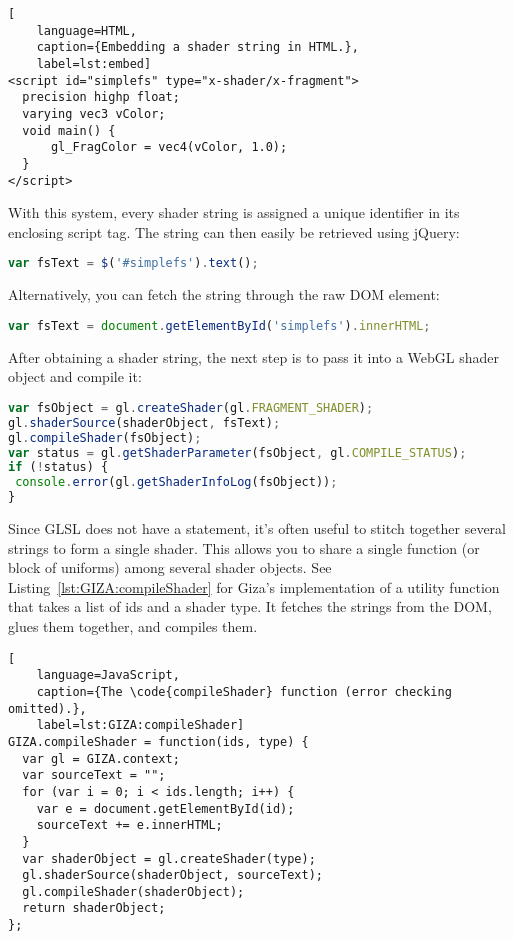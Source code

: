 \begin{lstlisting}[
    language=HTML,
    caption={Embedding a shader string in HTML.},
    label=lst:embed]
<script id="simplefs" type="x-shader/x-fragment">
  precision highp float;
  varying vec3 vColor;
  void main() {
      gl_FragColor = vec4(vColor, 1.0);
  }
</script>
\end{lstlisting}

With this system, every shader string is assigned a unique identifier in its enclosing script tag.  The string can then easily be retrieved using jQuery:

\begin{lstlisting}[language=JavaScript]
var fsText = $('#simplefs').text();
\end{lstlisting} %

Alternatively, you can fetch the string through the raw DOM element:

\begin{lstlisting}[language=JavaScript]
var fsText = document.getElementById('simplefs').innerHTML;
\end{lstlisting}

After obtaining a shader string, the next step is to pass it into a WebGL shader object and compile it:

\begin{lstlisting}[language=JavaScript]
var fsObject = gl.createShader(gl.FRAGMENT_SHADER);
gl.shaderSource(shaderObject, fsText);
gl.compileShader(fsObject);
var status = gl.getShaderParameter(fsObject, gl.COMPILE_STATUS);
if (!status) {
 console.error(gl.getShaderInfoLog(fsObject));
}
\end{lstlisting}

Since GLSL does not have a  statement, it's often useful to stitch together several strings to form a single shader.  This allows you to share a single function (or block of uniforms) among several shader objects.  See Listing~\ref{lst:GIZA:compileShader} for Giza's implementation of a utility function that takes a list of ids and a shader type.  It fetches the strings from the DOM, glues them together, and compiles them.

\begin{lstlisting}[
    language=JavaScript,
    caption={The \code{compileShader} function (error checking omitted).},
    label=lst:GIZA:compileShader]
GIZA.compileShader = function(ids, type) {
  var gl = GIZA.context;
  var sourceText = "";
  for (var i = 0; i < ids.length; i++) {
    var e = document.getElementById(id);
    sourceText += e.innerHTML;
  }
  var shaderObject = gl.createShader(type);
  gl.shaderSource(shaderObject, sourceText);
  gl.compileShader(shaderObject);
  return shaderObject;
};
\end{lstlisting}

